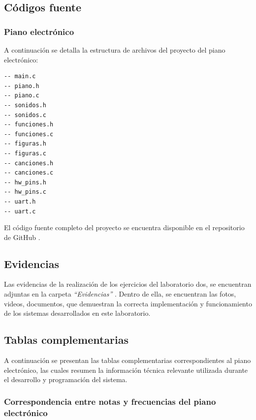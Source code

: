 \subsection{Códigos fuente}

\subsubsection{Piano electrónico}
A continuación se detalla la estructura de archivos del proyecto del piano electrónico:

\begin{verbatim}
-- main.c
-- piano.h
-- piano.c
-- sonidos.h
-- sonidos.c
-- funciones.h
-- funciones.c
-- figuras.h
-- figuras.c
-- canciones.h
-- canciones.c
-- hw_pins.h
-- hw_pins.c
-- uart.h
-- uart.c

\end{verbatim}

El código fuente completo del proyecto se encuentra disponible en el repositorio de GitHub \cite{utec_tecmicro}.

\subsection{Evidencias}

Las evidencias de la realización de los ejercicios del laboratorio dos, se encuentran adjuntas en la carpeta \textit{“Evidencias”} \cite{github_evidencias_lab2}. Dentro de ella, se encuentran las fotos, videos, documentos, que demuestran la correcta implementación y funcionamiento de los sistemas desarrollados en este laboratorio.

\vspace{0.3cm}

\subsection{Tablas complementarias}

A continuación se presentan las tablas complementarias correspondientes al piano electrónico, las cuales resumen la información técnica relevante utilizada durante el desarrollo y programación del sistema.

\vspace{0.5cm}

\subsubsection{Correspondencia entre notas y frecuencias del piano electrónico}

